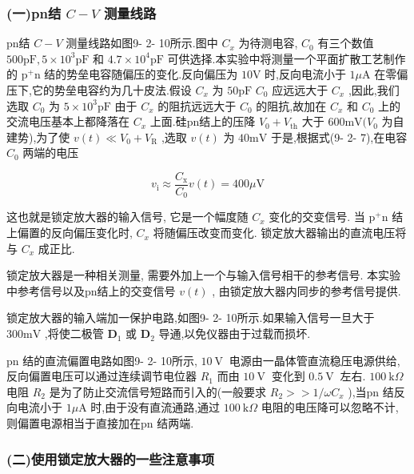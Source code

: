 \documentclass[12pt,a4paper]{article}
\begin{document}
\subsubsection*{(一)pn结 \(C - V\) 测量线路}

pn结 \(C - V\) 测量线路如图9- 2- 10所示.图中 \(C_{x}\) 为待测电容, \(C_{0}\) 有三个数值 \(500\mathrm{pF},5\times 10^{3}\mathrm{pF}\) 和 \(4.7\times 10^{4}\mathrm{pF}\) 可供选择.本实验中将测量一个平面扩散工艺制作的 \(\mathrm{p^{+}n}\) 结的势垒电容随偏压的变化.反向偏压为 \(10\mathrm{V}\) 时,反向电流小于 \(1\mu \mathrm{A}\) 在零偏压下,它的势垒电容约为几十皮法.假设 \(C_{x}\) 为 \(50\mathrm{pF}\) \(C_{0}\) 应远远大于 \(C_{x}\) ,因此,我们选取 \(C_{0}\) 为 \(5\times 10^{3}\mathrm{pF}\) 由于 \(C_{x}\) 的阻抗远远大于 \(C_{0}\) 的阻抗,故加在 \(C_{x}\) 和 \(C_{0}\) 上的交流电压基本上都降落在 \(C_{x}\) 上面.硅pn结上的压降 \(V_{0} + V_{\mathrm{th}}\) 大于 \(600\mathrm{mV}(V_{0}\) 为自建势),为了使 \(v(t)\ll V_{0} + V_{\mathrm{R}}\) ,选取 \(v(t)\) 为 \(40\mathrm{mV}\) 于是,根据式(9- 2- 7),在电容 \(C_{0}\) 两端的电压

\[
v_{\mathrm{i}}\approx \frac{C_{\mathrm{x}}}{C_{0}} v(t) = 400 \mu \mathrm{V} \tag{9-2-16}
\]

这也就是锁定放大器的输入信号, 它是一个幅度随 \(C_{x}\) 变化的交变信号. 当 \(\mathrm{p}^{+}\mathrm{n}\) 结上偏置的反向偏压变化时, \(C_{x}\) 将随偏压改变而变化. 锁定放大器输出的直流电压将与 \(C_{x}\) 成正比.

锁定放大器是一种相关测量, 需要外加上一个与输入信号相干的参考信号. 本实验中参考信号以及pn结上的交变信号 \(v(t)\) , 由锁定放大器内同步的参考信号提供.

锁定放大器的输入端加一保护电路,如图9- 2- 10所示.如果输入信号一旦大于 \(300\mathrm{mV}\) ,将使二极管 \(\mathbf{D}_{1}\) 或 \(\mathbf{D}_{2}\) 导通,以免仪器由于过载而损坏.

pn 结的直流偏置电路如图9- 2- 10所示, \(10\mathrm{~V~}\) 电源由一晶体管直流稳压电源供给,反向偏置电压可以通过连续调节电位器 \(R_{1}\) 而由 \(10\mathrm{~V~}\) 变化到 \(0.5\mathrm{~V~}\) 左右. \(100\mathrm{~k}\Omega\) 电阻 \(R_{2}\) 是为了防止交流信号短路而引入的(一般要求 \(R_{2} > > 1 / \omega C_{x}\) ),当pn 结反向电流小于 \(1\mu \mathrm{A}\) 时,由于没有直流通路,通过 \(100\mathrm{~k}\Omega\) 电阻的电压降可以忽略不计,则偏置电源相当于直接加在pn 结两端.

\subsubsection*{(二)使用锁定放大器的一些注意事项}
\end{document}
